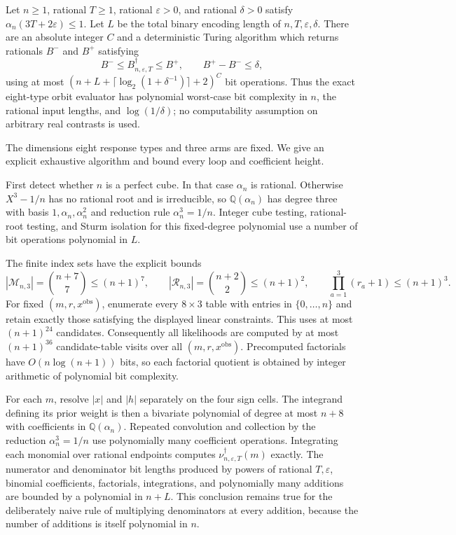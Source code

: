 Let \(n\ge1\), rational \(T\ge1\), rational \(\varepsilon>0\), and rational \(\delta>0\) satisfy \(\alpha_n(3T+2\varepsilon)\le1\).  Let \(L\) be the total binary encoding length of \(n,T,\varepsilon,\delta\).  There are an absolute integer \(C\) and a deterministic Turing algorithm which returns rationals \(B^-\) and \(B^+\) satisfying
\[
B^-\le B_{n,\varepsilon,T}^\dagger\le B^+,
\qquad B^+-B^-\le\delta,
\]
using at most \((n+L+\lceil\log_2(1+\delta^{-1})\rceil+2)^C\) bit operations.  Thus the exact eight-type orbit evaluator has polynomial worst-case bit complexity in \(n\), the rational input lengths, and \(\log(1/\delta)\); no computability assumption on arbitrary real contrasts is used.

The dimensions eight response types and three arms are fixed.  We give an explicit exhaustive algorithm and bound every loop and coefficient height.

First detect whether \(n\) is a perfect cube.  In that case \(\alpha_n\) is rational.  Otherwise \(X^3-1/n\) has no rational root and is irreducible, so \(\mathbb Q(\alpha_n)\) has degree three with basis \(1,\alpha_n,\alpha_n^2\) and reduction rule \(\alpha_n^3=1/n\).  Integer cube testing, rational-root testing, and Sturm isolation for this fixed-degree polynomial use a number of bit operations polynomial in \(L\).

The finite index sets have the explicit bounds
\[
|\mathcal M_{n,3}|={n+7\choose7}\le(n+1)^7,\qquad
|\mathcal R_{n,3}|={n+2\choose2}\le(n+1)^2,\qquad
\prod_{a=1}^3(r_a+1)\le(n+1)^3.
\]
For fixed \((m,r,x^{\mathrm{obs}})\), enumerate every \(8\times3\) table with entries in \(\{0,\ldots,n\}\) and retain exactly those satisfying the displayed linear constraints.  This uses at most \((n+1)^{24}\) candidates.  Consequently all likelihoods are computed by at most \((n+1)^{36}\) candidate-table visits over all \((m,r,x^{\mathrm{obs}})\).  Precomputed factorials have \(O(n\log(n+1))\) bits, so each factorial quotient is obtained by integer arithmetic of polynomial bit complexity.

For each \(m\), resolve \(|x|\) and \(|h|\) separately on the four sign cells.  The integrand defining its prior weight is then a bivariate polynomial of degree at most \(n+8\) with coefficients in \(\mathbb Q(\alpha_n)\).  Repeated convolution and collection by the reduction \(\alpha_n^3=1/n\) use polynomially many coefficient operations.  Integrating each monomial over rational endpoints computes \(\nu_{n,\varepsilon,T}^\dagger(m)\) exactly.  The numerator and denominator bit lengths produced by powers of rational \(T,\varepsilon\), binomial coefficients, factorials, integrations, and polynomially many additions are bounded by a polynomial in \(n+L\).  This conclusion remains true for the deliberately naive rule of multiplying denominators at every addition, because the number of additions is itself polynomial in \(n\).

